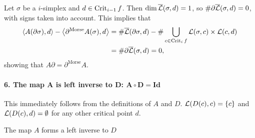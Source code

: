 \begin{myproof}
    Let $\sigma$ be a  $i$-simplex and $d \in \operatorname{Crit}_{i-1} f$.
    Then $\dim \overline{\mathcal L}(\sigma, d) = 1$, so  $\# \partial \overline{\mathcal L}(\sigma, d) = 0$, with signs taken into account.
    This implies that
    \begin{align*}
        \left<A(\partial \sigma), d \right> - \left<\partial^{\text{Morse}} A (\sigma) ,d\right> &= \# \overline{\mathcal L}(\partial \sigma, d) - \# \bigcup_{c \in  \operatorname{Crit}_i f} \mathcal L(\sigma, c) \times  \mathcal L(c, d)\\
                                                                                                 &= \# \partial \overline{\mathcal L}(\sigma, d) = 0
    ,\end{align*} 
    showing that $A \partial = \partial^{\text{Morse}} A$.


\paragraph{6. The map $\bm{A}$ is left inverse to $\bm{D}$: $\bm{A  \circ D = \text{Id}}$}
    This immediately follows from the definitions of $A$ and $D$.
    $\mathcal L(D(c), c) = \{c\}$ and $\mathcal L(D(c), d) = \emptyset$ for any other critical point $d$.
\begin{marginfigure}
    \centering
    \caption{The map $A$ forms a left inverse to $D$}
    \label{fig:a-is-left-inverse-to-d}
\end{marginfigure}



\end{myproof}
